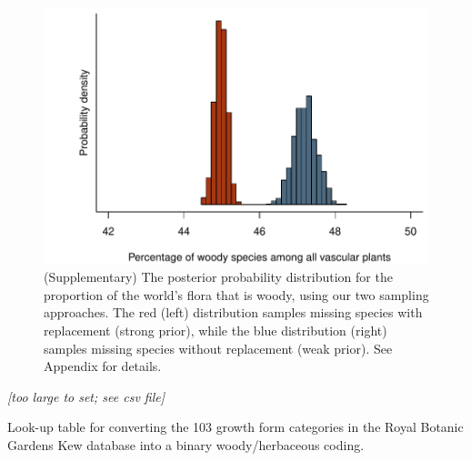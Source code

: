 \documentclass[12pt]{article}
\begin{document}
\begin{figure}[p]
  \centering
  \includegraphics{figs/distribution-raw}  
  \caption{(Supplementary) The posterior probability distribution for
    the proportion of the world's flora that is woody, using our two
    sampling approaches.  The red (left) distribution samples missing species
    with replacement (strong prior), while the blue distribution
    (right) samples missing species without replacement (weak prior).
    See Appendix for details.}
  \label{fig:distribution-raw}
\end{figure}

\begin{table}[p]
  \centering
  \textit{[too large to set; see csv file]}
  \caption{Look-up table for converting the 103 growth form categories
    in the Royal Botanic Gardens Kew database into a binary
woody/herbaceous coding.}
\label{tab:kew}
\end{table}
\end{document}
